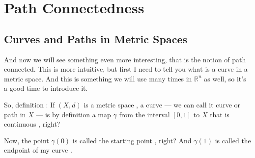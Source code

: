 \section{Path Connectedness}

\subsection{Curves and Paths in Metric Spaces}

\begin{speech}[00:31:05 - 00:32:57]
And now we will see something even more interesting, that is the notion of path connected. This is more intuitive, but first I need to tell you what is a curve in a metric space. And this is something we will use many times in $\mathbb{R}^n$ as well, so it's a good time to introduce it.


So, definition : If $(X, d)$ is a metric space , a curve  --- we can call it curve or path  in $X$  --- is by definition a map $\gamma$ from the interval $[0, 1]$ to $X$  that is continuous , right?

Now, the point $\gamma(0)$ is called the starting point , right? And $\gamma(1)$ is called the endpoint of my curve .
\end{speech}

\begin{hidden}
\end{hidden}

